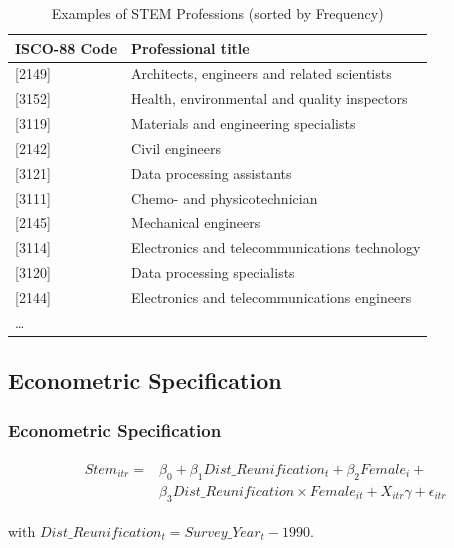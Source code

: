 \documentclass[11pt, aspectratio=1610, xcolor={dvipsnames}]{beamer}
\begin{document}
	\begin{frame}
		\frametitle{}
		
		{\linespread{1}\small
			\begin{table}[h]
				\centering
				\caption{Examples of STEM Professions (sorted by Frequency)}
				\label{tab:stem_examples}
		
				\begin{tabular}{ll}
					\toprule
					ISCO-88 Code & Professional title\\
					\midrule
					{[2149]} & Architects, engineers and related scientists \\
					{[3152]} & Health, environmental and quality inspectors\\
					{[3119]} & Materials and engineering specialists\\
					{[2142]} & Civil engineers\\
					{[3121]} & Data processing assistants\\
					{[3111]} & Chemo- and physicotechnician\\
					{[2145]} & Mechanical engineers\\
					{[3114]} & Electronics and telecommunications technology\\
					{[3120]} & Data processing specialists\\
					{[2144]} & Electronics and telecommunications engineers\\
					… &\\
					\bottomrule
				\end{tabular}
			\end{table}
		}
		
	\end{frame}
	
	\subsection{Econometric Specification}
	\begin{frame}
		\frametitle{Econometric Specification}
		
			{\linespread{1}\normalsize
				\begin{align}
					&\begin{aligned}
						\label{eq:spec}
						Stem_{itr} =& \beta_{0} + \beta_{1} Dist\_Reunification_{t} + \beta_{2} Female_{i} +\\
						&\beta_{3} Dist\_Reunification \times Female_{it} + X_{itr} \gamma + \epsilon_{itr}
					\end{aligned}
				\end{align}
				
				\vspace{1cm}
				
				\hspace{6.2em} with $Dist\_Reunification_{t} = Survey\_Year_{t} - 1990$.
			}
		
	\end{frame}
	
\end{document}
